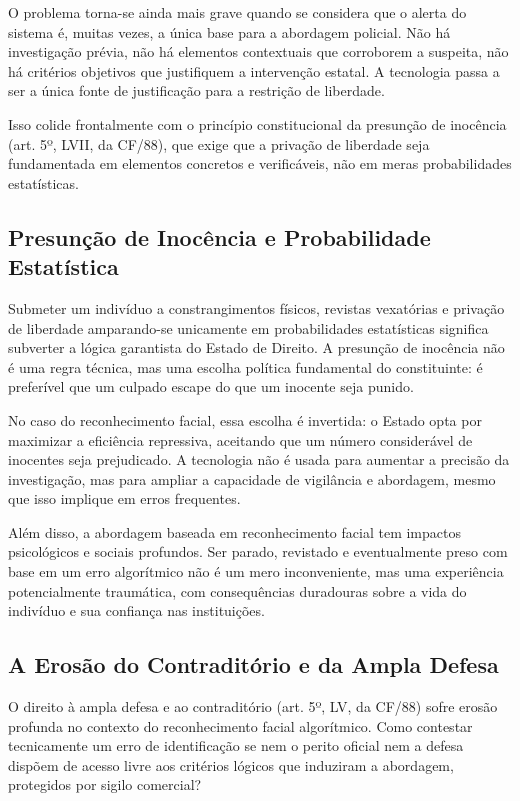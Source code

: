 \documentclass[12pt,a4paper]{article}
\begin{document}
O problema torna-se ainda mais grave quando se considera que o alerta do sistema é, muitas vezes, a única base para a abordagem policial. Não há investigação prévia, não há elementos contextuais que corroborem a suspeita, não há critérios objetivos que justifiquem a intervenção estatal. A tecnologia passa a ser a única fonte de justificação para a restrição de liberdade.

Isso colide frontalmente com o princípio constitucional da presunção de inocência (art. 5º, LVII, da CF/88), que exige que a privação de liberdade seja fundamentada em elementos concretos e verificáveis, não em meras probabilidades estatísticas.

\subsection{Presunção de Inocência e Probabilidade Estatística}

Submeter um indivíduo a constrangimentos físicos, revistas vexatórias e privação de liberdade amparando-se unicamente em probabilidades estatísticas significa subverter a lógica garantista do Estado de Direito. A presunção de inocência não é uma regra técnica, mas uma escolha política fundamental do constituinte: é preferível que um culpado escape do que um inocente seja punido.

No caso do reconhecimento facial, essa escolha é invertida: o Estado opta por maximizar a eficiência repressiva, aceitando que um número considerável de inocentes seja prejudicado. A tecnologia não é usada para aumentar a precisão da investigação, mas para ampliar a capacidade de vigilância e abordagem, mesmo que isso implique em erros frequentes.

Além disso, a abordagem baseada em reconhecimento facial tem impactos psicológicos e sociais profundos. Ser parado, revistado e eventualmente preso com base em um erro algorítmico não é um mero inconveniente, mas uma experiência potencialmente traumática, com consequências duradouras sobre a vida do indivíduo e sua confiança nas instituições.

\subsection{A Erosão do Contraditório e da Ampla Defesa}

O direito à ampla defesa e ao contraditório (art. 5º, LV, da CF/88) sofre erosão profunda no contexto do reconhecimento facial algorítmico. Como contestar tecnicamente um erro de identificação se nem o perito oficial nem a defesa dispõem de acesso livre aos critérios lógicos que induziram a abordagem, protegidos por sigilo comercial?
\end{document}

